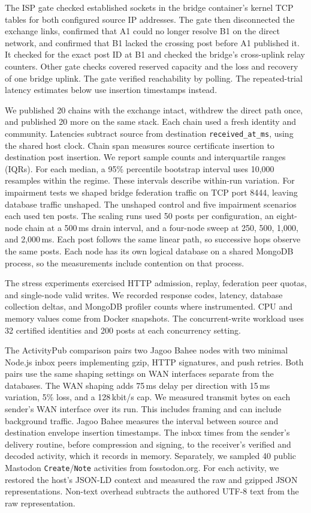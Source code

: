 \documentclass[conference,a4paper,10pt]{IEEEtran}
\begin{document}
The ISP gate checked established sockets in the bridge container's kernel TCP tables for both configured source IP addresses. The gate then disconnected the exchange links, confirmed that A1 could no longer resolve B1 on the direct network, and confirmed that B1 lacked the crossing post before A1 published it. It checked for the exact post ID at B1 and checked the bridge's cross-uplink relay counters. Other gate checks covered reserved capacity and the loss and recovery of one bridge uplink. The gate verified reachability by polling. The repeated-trial latency estimates below use insertion timestamps instead.

We published 20 chains with the exchange intact, withdrew the direct path once, and published 20 more on the same stack. Each chain used a fresh identity and community. Latencies subtract source from destination \texttt{received\_at\_ms}, using the shared host clock. Chain span measures source certificate insertion to destination post insertion. We report sample counts and interquartile ranges (IQRs). For each median, a 95\% percentile bootstrap interval uses 10,000 resamples within the regime. These intervals describe within-run variation. For impairment tests we shaped bridge federation traffic on TCP port 8444, leaving database traffic unshaped. The unshaped control and five impairment scenarios each used ten posts. The scaling runs used 50 posts per configuration, an eight-node chain at a 500\,ms drain interval, and a four-node sweep at 250, 500, 1,000, and 2,000\,ms. Each post follows the same linear path, so successive hops observe the same posts. Each node has its own logical database on a shared MongoDB process, so the measurements include contention on that process.

The stress experiments exercised HTTP admission, replay, federation peer quotas, and single-node valid writes. We recorded response codes, latency, database collection deltas, and MongoDB profiler counts where instrumented. CPU and memory values come from Docker snapshots. The concurrent-write workload uses 32 certified identities and 200 posts at each concurrency setting.

The ActivityPub comparison pairs two Jagoo Bahee nodes with two minimal Node.js inbox peers implementing gzip, HTTP signatures, and push retries. Both pairs use the same shaping settings on WAN interfaces separate from the databases. The WAN shaping adds 75\,ms delay per direction with 15\,ms variation, 5\% loss, and a 128\,kbit/s cap. We measured transmit bytes on each sender's WAN interface over its run. This includes framing and can include background traffic. Jagoo Bahee measures the interval between source and destination envelope insertion timestamps. The inbox times from the sender's delivery routine, before compression and signing, to the receiver's verified and decoded activity, which it records in memory. Separately, we sampled 40 public Mastodon \texttt{Create}/\texttt{Note} activities from fosstodon.org. For each activity, we restored the host's JSON-LD context and measured the raw and gzipped JSON representations. Non-text overhead subtracts the authored UTF-8 text from the raw representation.
\end{document}
